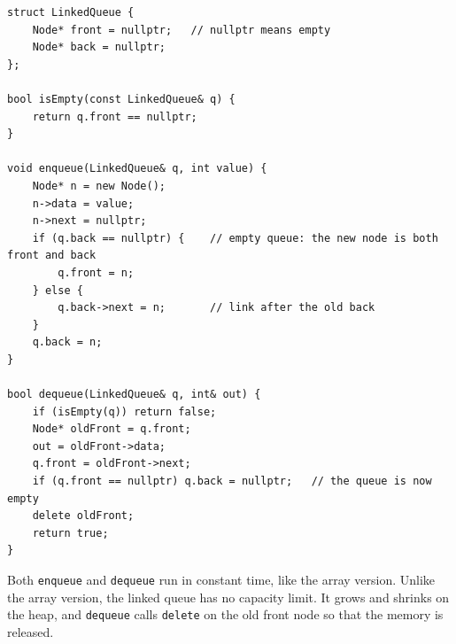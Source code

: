 \begin{verbatim}
struct LinkedQueue {
    Node* front = nullptr;   // nullptr means empty
    Node* back = nullptr;
};

bool isEmpty(const LinkedQueue& q) {
    return q.front == nullptr;
}

void enqueue(LinkedQueue& q, int value) {
    Node* n = new Node();
    n->data = value;
    n->next = nullptr;
    if (q.back == nullptr) {    // empty queue: the new node is both front and back
        q.front = n;
    } else {
        q.back->next = n;       // link after the old back
    }
    q.back = n;
}

bool dequeue(LinkedQueue& q, int& out) {
    if (isEmpty(q)) return false;
    Node* oldFront = q.front;
    out = oldFront->data;
    q.front = oldFront->next;
    if (q.front == nullptr) q.back = nullptr;   // the queue is now empty
    delete oldFront;
    return true;
}
\end{verbatim}

Both \texttt{enqueue} and \texttt{dequeue} run in constant time, like the array version. Unlike the array version, the linked queue has no capacity limit. It grows and shrinks on the heap, and \texttt{dequeue} calls \texttt{delete} on the old front node so that the memory is released.
